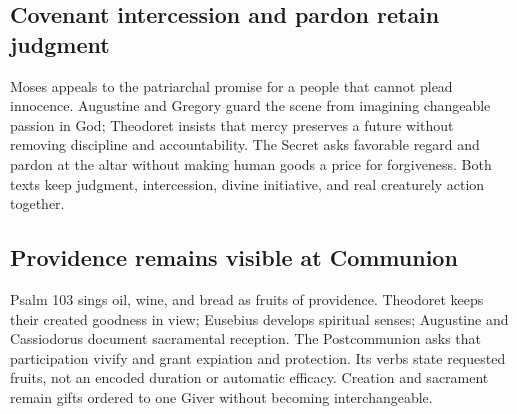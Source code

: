 \subsection*{Covenant intercession and pardon retain judgment}

Moses appeals to the patriarchal promise for a people that cannot plead
innocence. Augustine and Gregory guard the scene from imagining changeable
passion in God; Theodoret insists that mercy preserves a future without
removing discipline and accountability. The Secret asks favorable regard and
pardon at the altar without making human goods a price for forgiveness. Both
texts keep judgment, intercession, divine initiative, and real creaturely
action together.

\subsection*{Providence remains visible at Communion}

Psalm 103 sings oil, wine, and bread as fruits of providence. Theodoret keeps
their created goodness in view; Eusebius develops spiritual senses; Augustine
and Cassiodorus document sacramental reception. The Postcommunion asks that
participation vivify and grant expiation and protection. Its verbs state
requested fruits, not an encoded duration or automatic efficacy. Creation and
sacrament remain gifts ordered to one Giver without becoming interchangeable.
